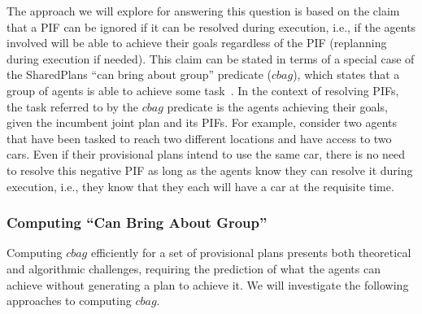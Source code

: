 \documentclass[11pt]{article}
\begin{document}



The approach we will explore for answering this question is based on the claim that a PIF can be ignored if it can be resolved during execution, i.e., if the agents involved will be able to achieve their goals regardless of the PIF (replanning during execution if needed). This claim can be stated in terms of a  special case of the SharedPlans ``can bring about group'' predicate ($cbag$), which states that a group of agents is able to achieve some task~\cite{grosz1996collaborative}. In the context of resolving PIFs, the task referred to by the $cbag$ predicate is the agents achieving their goals, given the incumbent joint plan and its PIFs.  
For example, consider two agents that have been tasked to reach two different locations and have access to two cars. Even if their provisional plans intend to use the same car, there is no need to resolve this negative PIF as long as the agents know they can resolve it during execution, i.e., they know that they each will have a car at the requisite time. 



\subsubsection{Computing ``Can Bring About Group''}
\label{sec:computing}
Computing $cbag$ efficiently for a set of provisional plans presents both theoretical and algorithmic challenges, requiring the prediction of what the agents can achieve without generating a plan to achieve it. We will investigate the following approaches to computing $cbag$. 
\end{document}
